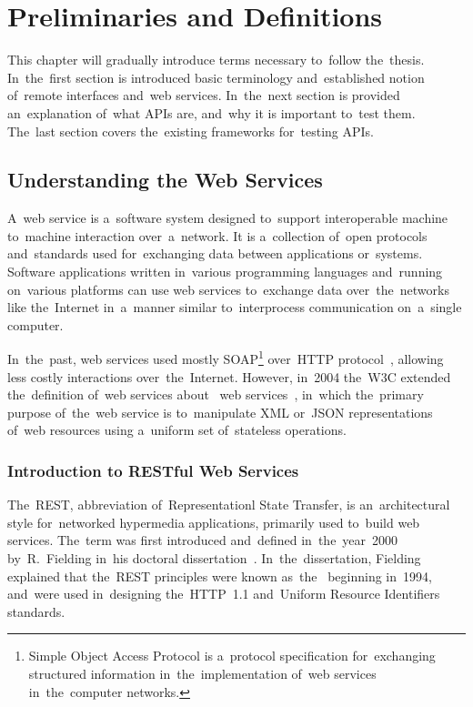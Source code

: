 

\chapter{Preliminaries and Definitions}
\label{Preliminaries}
This chapter will gradually introduce terms necessary to~follow the~thesis.
In~the~first section is introduced basic terminology and~established notion
of~remote interfaces and~web services. In~the~next section is provided
an~explanation of~what APIs are, and~why it is important to~test them. The~last
section covers the~existing frameworks for~testing APIs.


\section{Understanding the Web Services}
\label{WebServices}
A~web service is a~software system designed to~support interoperable machine
to~machine interaction over~a~network. It is a~collection of~open protocols
and~standards used for~exchanging data between applications or~systems. Software
applications written in~various programming languages and~running on~various
platforms can use web services to~exchange data over~the~networks like
the~Internet in~a~manner similar to~interprocess communication on~a~single
computer.

In~the~past, web services used mostly SOAP\footnote{Simple Object Access
Protocol is a~protocol specification for~exchanging structured information
in~the~implementation of~web services in~the~computer networks.} over~HTTP
protocol~\cite{HTTP}, allowing less costly interactions over~the~Internet.
However, in~2004 the~W3C extended the~definition of~web services
about~ web services~\cite{W3CWebServices}, in~which
the~primary purpose of~the~web service is to~manipulate XML or~JSON
representations of~web resources using a~uniform set of~stateless operations.


\subsection{Introduction to RESTful Web Services}
The~REST, abbreviation of~Representationl State Transfer, is an~architectural
style for~networked hypermedia applications, primarily used to~build web
services. The~term was first introduced and~defined in~the~year~2000
by~R.~Fielding in~his doctoral dissertation~\cite{FieldingDissertation}.
In~the~dissertation, Fielding explained that the~REST principles were known
as~the~ beginning in~1994, and~were used in~designing
the~HTTP~1.1 and~Uniform Resource Identifiers~\cite{URI-RFC} standards.


